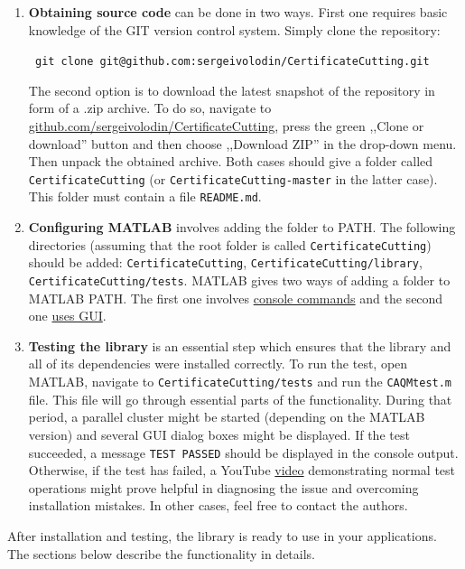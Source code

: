 \documentclass[a4paper]{article}
\theoremstyle{definition}
\begin{document}
\begin{enumerate}
\item {\bf Obtaining source code} can be done in two ways. First one requires basic knowledge of the GIT version control system. Simply clone the repository:
\begin{center}\tt
git clone git@github.com:sergeivolodin/CertificateCutting.git
\end{center}
The second option is to download the latest snapshot of the repository in form of a .zip archive. To do so, navigate to \href{https://github.com/sergeivolodin/CertificateCutting}{github.com/sergeivolodin/CertificateCutting}, press the green ,,Clone or download'' button and then choose ,,Download ZIP'' in the drop-down menu. Then unpack the obtained archive. Both cases should give a folder called {\tt CertificateCutting} (or {\tt CertificateCutting-master} in the latter case). This folder must contain a file {\tt README.md}.
\item {\bf Configuring MATLAB} involves adding the folder to PATH. The following directories (assuming that the root folder is called {\tt CertificateCutting}) should be added: {\tt CertificateCutting}, {\tt CertificateCutting/library}, {\tt CertificateCutting/tests}. MATLAB gives two ways of adding a folder to MATLAB PATH. The first one involves \href{https://www.mathworks.com/help/matlab/ref/addpath.html}{console commands} and the second one \href{http://www.mathworks.com/help/matlab/ref/pathtool.html}{uses GUI}.
\item {\bf Testing the library} is an essential step which ensures that the library and all of its dependencies were installed correctly. To run the test, open MATLAB, navigate to {\tt CertificateCutting/tests} and run the {\tt CAQMtest.m} file. This file will go through essential parts of the functionality. During that period, a parallel cluster might be started (depending on the MATLAB version) and several GUI dialog boxes might be displayed. If the test succeeded, a message {\tt TEST PASSED} should be displayed in the console output. Otherwise, if the test has failed, a YouTube \href{https://youtu.be/Ikh_GDHnu-4}{video} demonstrating normal test operations might prove helpful in diagnosing the issue and overcoming installation mistakes. In other cases, feel free to contact the authors.
\end{enumerate}

After installation and testing, the library is ready to use in your applications. The sections below describe the functionality in details.
\end{document}
